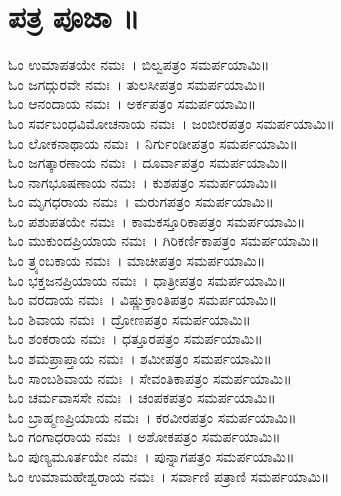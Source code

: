 \section{ಪತ್ರ ಪೂಜಾ ॥}
ಓಂ ಉಮಾಪತಯೇ ನಮಃ~। ಬಿಲ್ವಪತ್ರಂ ಸಮರ್ಪಯಾಮಿ॥\\
ಓಂ ಜಗದ್ಗುರವೇ ನಮಃ~। ತುಲಸೀಪತ್ರಂ ಸಮರ್ಪಯಾಮಿ॥\\
ಓಂ ಆನಂದಾಯ ನಮಃ~। ಅರ್ಕಪತ್ರಂ ಸಮರ್ಪಯಾಮಿ॥\\
ಓಂ ಸರ್ವಬಂಧವಿಮೋಚನಾಯ ನಮಃ~। ಜಂಬೀರಪತ್ರಂ ಸಮರ್ಪಯಾಮಿ॥\\
ಓಂ ಲೋಕನಾಥಾಯ ನಮಃ~। ನಿರ್ಗುಂಡೀಪತ್ರಂ ಸಮರ್ಪಯಾಮಿ॥\\
ಓಂ ಜಗತ್ಕಾರಣಾಯ ನಮಃ~। ದೂರ್ವಾಪತ್ರಂ ಸಮರ್ಪಯಾಮಿ॥\\
ಓಂ ನಾಗಭೂಷಣಾಯ ನಮಃ~। ಕುಶಪತ್ರಂ ಸಮರ್ಪಯಾಮಿ॥\\
ಓಂ ಮೃಗಧರಾಯ ನಮಃ~। ಮರುಗಪತ್ರಂ ಸಮರ್ಪಯಾಮಿ॥\\
ಓಂ ಪಶುಪತಯೇ ನಮಃ~। ಕಾಮಕಸ್ತೂರಿಕಾಪತ್ರಂ ಸಮರ್ಪಯಾಮಿ॥\\
ಓಂ ಮುಕುಂದಪ್ರಿಯಾಯ ನಮಃ~। ಗಿರಿಕರ್ಣಿಕಾಪತ್ರಂ ಸಮರ್ಪಯಾಮಿ॥\\
ಓಂ ತ್ರ್ಯಂಬಕಾಯ ನಮಃ~। ಮಾಚೀಪತ್ರಂ ಸಮರ್ಪಯಾಮಿ॥\\
ಓಂ ಭಕ್ತಜನಪ್ರಿಯಾಯ ನಮಃ~। ಧಾತ್ರೀಪತ್ರಂ ಸಮರ್ಪಯಾಮಿ॥\\
ಓಂ ವರದಾಯ ನಮಃ~। ವಿಷ್ಣುಕ್ರಾಂತಿಪತ್ರಂ ಸಮರ್ಪಯಾಮಿ॥\\
ಓಂ ಶಿವಾಯ ನಮಃ~। ದ್ರೋಣಪತ್ರಂ ಸಮರ್ಪಯಾಮಿ॥\\
ಓಂ ಶಂಕರಾಯ ನಮಃ~। ಧತ್ತೂರಪತ್ರಂ ಸಮರ್ಪಯಾಮಿ॥\\
ಓಂ ಶಮಪ್ರಾಪ್ತಾಯ ನಮಃ~। ಶಮೀಪತ್ರಂ ಸಮರ್ಪಯಾಮಿ॥\\
ಓಂ ಸಾಂಬಶಿವಾಯ ನಮಃ~। ಸೇವಂತಿಕಾಪತ್ರಂ ಸಮರ್ಪಯಾಮಿ॥\\
ಓಂ ಚರ್ಮವಾಸಸೇ ನಮಃ~। ಚಂಪಕಪತ್ರಂ ಸಮರ್ಪಯಾಮಿ॥\\
ಓಂ ಬ್ರಾಹ್ಮಣಪ್ರಿಯಾಯ ನಮಃ~। ಕರವೀರಪತ್ರಂ ಸಮರ್ಪಯಾಮಿ॥\\
ಓಂ ಗಂಗಾಧರಾಯ ನಮಃ~। ಅಶೋಕಪತ್ರಂ ಸಮರ್ಪಯಾಮಿ॥\\
ಓಂ ಪುಣ್ಯಮೂರ್ತಯೇ ನಮಃ~। ಪುನ್ನಾಗಪತ್ರಂ ಸಮರ್ಪಯಾಮಿ॥\\
ಓಂ ಉಮಾಮಹೇಶ್ವರಾಯ ನಮಃ~। ಸರ್ವಾಣಿ ಪತ್ರಾಣಿ ಸಮರ್ಪಯಾಮಿ॥

